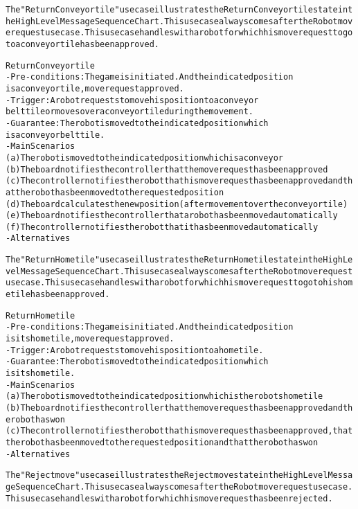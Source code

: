 \begin{alltt}
The "Return Conveyor tile" use case illustrates the Return Conveyor tile state in the High Level Message Sequence Chart. This use case always comes after the Robot move request use case. This use case handles with a robot for which his move request to go to a conveyor tile has been approved.

Return Conveyor tile
- Pre-conditions: The game is initiated. And the indicated position
    is a conveyor tile, move request approved.
- Trigger: A robot requests to move his position to a conveyor
    belt tile or moves over a conveyor tile during the movement.
- Guarantee: The robot is moved to the indicated position which
    is a conveyor belt tile.
- Main Scenarios
    (a) The robot is moved to the indicated position which is a conveyor
    (b) The board notifies the controller that the move request has been approved
    (c) The controller notifies the robot that his move request has been approved and that the robot has been moved to the requested position
    (d) The board calculates the new position (after movement over the conveyor tile)
    (e) The board notifies the controller that a robot has been moved automatically
    (f) The controller notifies the robot that it has been moved automatically
- Alternatives

The "Return Home tile" use case illustrates the Return Home tile state in the High Level Message Sequence Chart. This use case always comes after the Robot move request use case. This use case handles with a robot for which his move request to go to his home tile has been approved.

Return Home tile
- Pre-conditions: The game is initiated. And the indicated position
    is its home tile, move request approved.
- Trigger: A robot requests to move his position to a home tile.
- Guarantee: The robot is moved to the indicated position which
    is its home tile.
- Main Scenarios
    (a) The robot is moved to the indicated position which is the robots home tile
    (b) The board notifies the controller that the move request has been approved and the robot has won
    (c) The controller notifies the robot that his move request has been approved, that the robot has been moved to the requested position and that the robot has won
- Alternatives

The "Reject move" use case illustrates the Reject move state in the High Level Message Sequence Chart. This use case always comes after the Robot move request use case. This use case handles with a robot for which his move request has been rejected.


\end{alltt}
